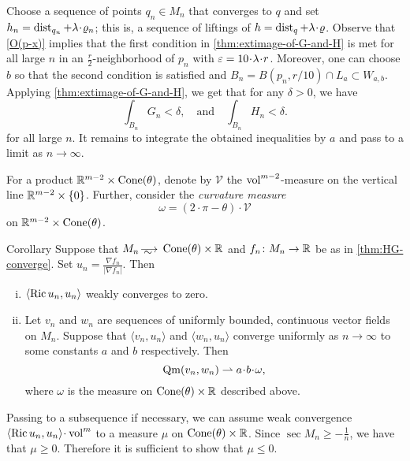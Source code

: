 Choose a sequence of points $q_n\in M_n$ that converges to $q$ and set $h_n\zz=\dist_{q_n}+\lambda\cdot \rho_n$;
this is, a sequence of liftings of $h=\dist_q+\lambda\cdot \rho$. 
Observe that \ref{O(p-x)} implies that the first condition in \ref{thm:extimage-of-G-and-H} is met for all large $n$ in an $\tfrac r2$-neighborhood of $p_n$ with $\eps=10\cdot\lambda\cdot r$.
Moreover, one can choose $b$ so that the second condition is satisfied and $B_n=B(p_n,r/10)\cap L_a\subset W_{a,b}$.
Applying \ref{thm:extimage-of-G-and-H}, we get that for any $\delta>0$, we have 
\[
\int_{B_n}G_n<\delta,
\quad\text{and}\quad
\int_{B_n}H_n<\delta.
\]
for all large $n$.
It remains to integrate the obtained inequalities by $a$ and pass to a limit as $n\to\infty$.
\qeds

For a product $\mathbb{R}^{m-2}\times \operatorname{Cone}(\theta)$, denote by $\mathcal{V}$ the $\operatorname{vol}^{m-2}$-measure on the vertical line $\mathbb{R}^{m-2}\times \{0\}$.
Further, consider the \emph{curvature measure} 
\[\omega=(2\cdot\pi-\theta)\cdot \mathcal{V}\]
on $\mathbb{R}^{m-2}\times \operatorname{Cone}(\theta)$. 


\begin{thm}{Corollary}\label{cor:Ricci}
Suppose that $M_n\smooths{}  \Cone(\theta)\times \RR$ and $f_n\colon M_n\to \mathbb{R}$ be as in \ref{thm:HG-converge}.
Set $u_n=\tfrac{\nabla f_n}{|\nabla f_n|}$.
Then 

\begin{enumerate}[(i)]
\item\label{cor:Ricci:Ricci} $\langle \operatorname{\rm Ric} u_n,u_n\rangle$ weakly converges to zero.
\item\label{cor:Ricci:vw}
Let $v_n$ and $w_n$ are sequences of uniformly bounded, continuous vector fields on $M_n$.
Suppose that $\langle v_n,u_n\rangle$ and $\langle w_n,u_n\rangle$ converge uniformly as $n\to \infty$ to some constants $a$ and $b$ respectively.
Then 
\[\Qm(v_n,w_n)\rightharpoonup a\cdot b\cdot \omega,\]
where $\omega$ is the measure on $\operatorname{Cone}(\theta)\times \mathbb{R}$  described above.

\end{enumerate}

\end{thm}

Passing to a subsequence if necessary, we can assume weak convergence $\langle \Ric u_n,u_n\rangle\cdot\vol^m$ to a measure $\mu$ on $\operatorname{Cone}(\theta)\times \mathbb{R}$.
Since $\sec M_n\ge -\tfrac1n$, we have that $\mu\ge 0$.
Therefore it is sufficient to show that $\mu\le 0$.

